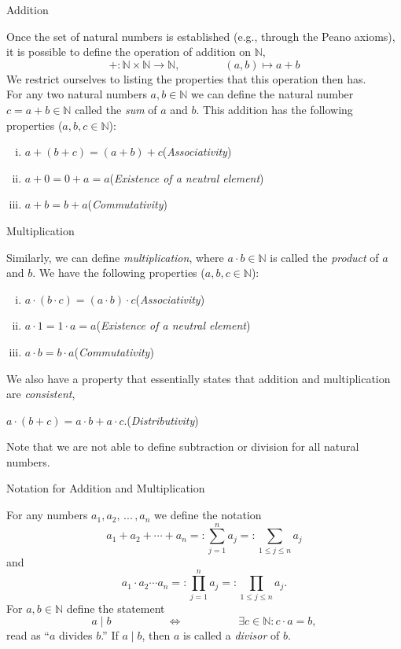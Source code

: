 \documentclass[smaller,hyperref={CJKbookmarks=true}]{beamer}
\newcommand{\N}{\mathbb{N}} \newcommand{\Z}{\mathbb{Z}} \newcommand{\Q}{\mathbb{Q}}
\begin{document}
\begin{frame}[c]{Addition}
\begin{spacing}{1.1}
Once the set of natural numbers is established (e.g., through the Peano
axioms), it is possible to define the operation of addition on $\N$,
\[+\!:\N\times\N\to\N,\qquad\qquad
(a,b)\mapsto a+b\]
We restrict ourselves to listing the properties that this operation then has.\\[5pt]
For any two natural numbers $a,b\in\N$ we can define the natural number $c=a+b\in\N$ called the \emph{sum} of $a$ and $b$. This addition has the following properties ($a,b,c\in\N$):\\[4pt]
\begin{enumerate}[(i)]
  \item $a+(b+c)=(a+b)+c$\hfill(\emph{Associativity})
  \item $a+0=0+a=a$\hfill(\emph{Existence of a neutral element})
  \item $a+b=b+a$\hfill(\emph{Commutativity})
\end{enumerate}
\end{spacing}
\end{frame}
\begin{frame}[c,label=82]{Multiplication}
\begin{spacing}{1.2}
Similarly, we can define \emph{multiplication}, where $a\cdot b\in\N$ is called the \emph{product} of $a$ and $b$. We have the following properties ($a,b,c\in\N$):
\begin{enumerate}[(i)]
  \item $a\cdot(b\cdot c)=(a\cdot b)\cdot c$\hfill(\emph{Associativity})
  \item $a\cdot1=1\cdot a=a$\hfill(\emph{Existence of a neutral element})
  \item $a\cdot b=b\cdot a$\hfill(\emph{Commutativity})
\end{enumerate}
We also have a property that essentially states that addition and
multiplication are \emph{consistent},
\begin{flushright}
  $a\cdot(b+c)=a\cdot b+a\cdot c$.(\emph{Distributivity})
\end{flushright}
Note that we are not able to define subtraction or division for all natural
numbers.
\end{spacing}
\end{frame}
\begin{frame}[c]{Notation for Addition and Multiplication}
\begin{spacing}{1.1}
For any numbers $a_1,a_2,\,...\,,a_n$ we define the notation
\[a_1+a_2+\cdots+a_n=:\sum_{j=1}^{n}a_j=:
\sum_{1\leq j\leq n}a_j\]
and
\[a_1\cdot a_2\cdots a_n=:\prod_{j=1}^{n}a_j=:\prod_{1\leq j\leq n}a_j.\]
For $a,b\in\N$ define the statement
\[a\mid b\qquad\qquad\quad
\Leftrightarrow\qquad\qquad\quad
\exists c\in\N\!:c\cdot a=b,\]
read as ``$a$ divides $b$.'' If $a\mid b$, then $a$ is called a \emph{divisor} of $b$.
\end{spacing}
\end{frame}
\end{document}
